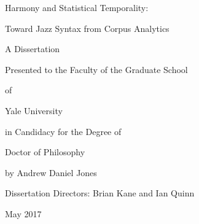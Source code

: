 \documentclass[12pt,titlepage]{report}
\begin{document}

\newpage

\titlepage

\vspace{1in}

\centerline{ \large Harmony and Statistical Temporality:}

\centerline{ \large Toward Jazz Syntax from Corpus Analytics}

\vspace{3.5in}

{\centering
{}
A Dissertation

Presented to the Faculty of the Graduate School

of

Yale University

in Candidacy for the Degree of

Doctor of Philosophy

\vspace{1.5in}

by
Andrew Daniel Jones

\vspace{0.5in}

Dissertation Directors: Brian Kane and Ian Quinn

\vspace{0.5in}

May 2017

}
\setcounter{page}{1}
\tableofcontents
\newpage
\listoffigures
\newpage
\setcounter{page}{1}
%
%
\printbibliography
\end{document}
